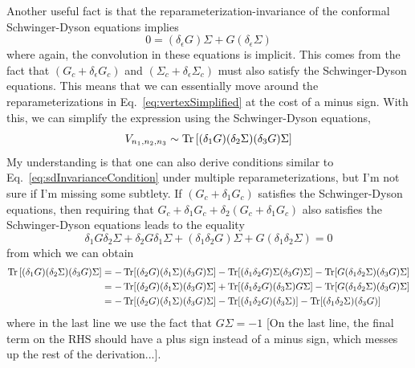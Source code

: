 \documentclass[aps,prx,preprint,onecolumn,citeautoscript,footinbib]{revtex4-1}
\newcommand{\note}[1]{{\color{red}[#1]}}
\begin{document}
Another useful fact is that the reparameterization-invariance of the conformal Schwinger-Dyson equations implies
\begin{equation}
    0 = (\delta_\epsilon G) \Sigma + G (\delta_\epsilon \Sigma)
    \label{eq:sdInvarianceCondition}
\end{equation}
where again, the convolution in these equations is implicit. This comes from the fact that $(G_c + \delta_\epsilon G_c)$ and $(\Sigma_c + \delta_\epsilon \Sigma_c)$ must also satisfy the Schwinger-Dyson equations. This means that we can essentially move around the reparameterizations in Eq.~\ref{eq:vertexSimplified} at the cost of a minus sign.
With this, we can simplify the expression using the Schwinger-Dyson equations,
\begin{equation}
    V_{n_1, n_2, n_3} \sim \Tr\left[(\delta_1 G) (\delta_2 \Sigma) (\delta_3 G) \Sigma\right]
\end{equation}
My understanding is that one can also derive conditions similar to Eq.~\ref{eq:sdInvarianceCondition} under multiple reparameterizations, but I'm not sure if I'm missing some subtlety. If $(G_c + \delta_1 G_c)$ satisfies the Schwinger-Dyson equations, then requiring that $G_c + \delta_1 G_c + \delta_2(G_c + \delta_1 G_c)$ also satisfies the Schwinger-Dyson equations leads to the equality
\begin{equation}
    \delta_1 G \delta_2 \Sigma + \delta_2 G \delta_1 \Sigma + (\delta_1 \delta_2 G) \Sigma + G (\delta_1 \delta_2 \Sigma) = 0
\end{equation}
from which we can obtain
\begin{equation}
\begin{aligned}
    \Tr \left[ (\delta_1 G) (\delta_2 \Sigma) (\delta_3 G) \Sigma \right] &= - \Tr[(\delta_2 G)(\delta_1 \Sigma)(\delta_3 G) \Sigma] - \Tr[(\delta_1 \delta_2 G) \Sigma (\delta_3 G) \Sigma] - \Tr[G (\delta_1 \delta_2 \Sigma) (\delta_3 G)\Sigma ]
    \\
     &= -\Tr[(\delta_2 G)(\delta_1 \Sigma)(\delta_3 G) \Sigma] + \Tr[(\delta_1 \delta_2 G) (\delta_3 \Sigma) G \Sigma] - \Tr[G (\delta_1 \delta_2 \Sigma) (\delta_3 G)\Sigma]
    \\
    &= -\Tr[(\delta_2 G)(\delta_1 \Sigma)(\delta_3 G) \Sigma] - \Tr[(\delta_1 \delta_2 G) (\delta_3 \Sigma)] - \Tr[(\delta_1 \delta_2 \Sigma) (\delta_3 G)]
    \end{aligned}
\end{equation}
where in the last line we use the fact that $G \Sigma = -1$ \note{On the last line, the final term on the RHS should have a plus sign instead of a minus sign, which messes up the rest of the derivation...}.
\end{document}
